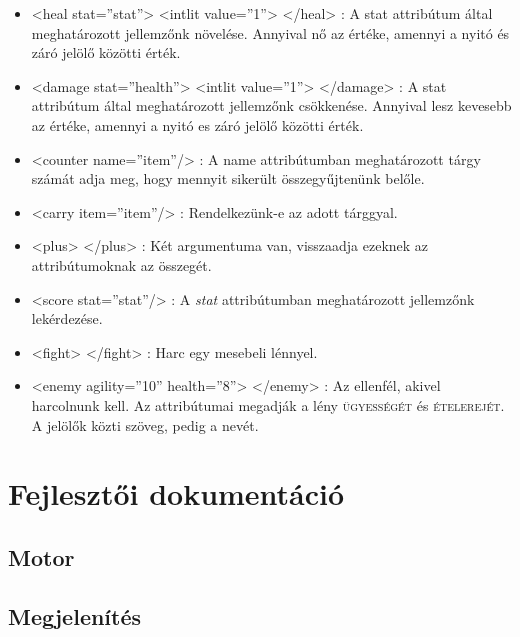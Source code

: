 \documentclass[12pt,a4paper,oneside]{report}
\newcommand{\stat}{\textsc}
\newcommand{\attr}{\emph}
\begin{document}
\begin{itemize}
      \item <{\color{Tag}heal}
        {\color{Attr}stat}={\color{Value}''stat}''> <{\color{Tag}intlit}
        {\color{Attr}value}={\color{Value}''1''}> <{\color{Tag}/heal}> :
        A stat attribútum által meghatározott jellemzőnk
        növelése. Annyival nő az értéke, amennyi a nyitó és záró
        jelölő közötti érték.
    
      \item <{\color{Tag}damage}
        {\color{Attr}stat}={\color{Value}''health''}>
        <{\color{Tag}intlit} {\color{Attr}value}={\color{Value}''1''}>
        <{\color{Tag}/damage}> : A stat attribútum által meghatározott
        jellemzőnk csökkenése. Annyival lesz kevesebb az értéke,
        amennyi a nyitó es záró jelölő közötti érték.
    
      \item <{\color{Tag}counter}
        {\color{Attr}name}={\color{Value}''item''}/> : A name
        attribútumban meghatározott tárgy számát adja meg, hogy
        mennyit sikerült összegyűjtenünk belőle.
    
      \item <{\color{Tag}carry}
        {\color{Attr}item}={\color{Value}''item''}/> : Rendelkezünk-e az
        adott tárggyal.
    
      \item <{\color{Tag}plus}> <{\color{Tag}/plus}> : Két argumentuma
        van, visszaadja ezeknek az attribútumoknak az összegét.
    
      \item <{\color{Tag}score}
        {\color{Attr}stat}={\color{Value}''stat''}/> : A \attr{stat}
        attribútumban meghatározott jellemzőnk lekérdezése.
    
      \item <{\color{Tag}f{}ight}> <{\color{Tag}/f{}ight}> : Harc egy
        mesebeli lénnyel.
    
      \item <{\color{Tag}enemy}
        {\color{Attr}agility}={\color{Value}''10''}
        {\color{Attr}health}={\color{Value}''8''}> </enemy> : Az
        ellenfél, akivel harcolnunk kell. Az attribútumai megadják a
        lény \stat{ügyességét} és \stat{ételerejét}. A jelölők közti
        szöveg, pedig a nevét.
    \end{itemize}
  \section{Fejlesztői dokumentáció}
    \subsection{Motor}
    \subsection{Megjelenítés}
\end{document}
